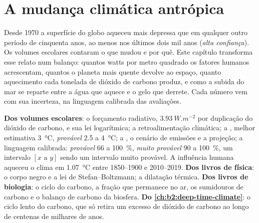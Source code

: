 \chapter{A mudança climática antrópica}\label{ch:b2:anthropogenic-climate-change}

Desde 1970 a superfície do globo aqueceu mais depressa que em qualquer outro período de cinquenta anos, ao menos nos
últimos dois mil anos (\emph{alta confiança}). Os volumes escolares contaram o que mudou e
por quê. Este capítulo transforma esse relato num balanço: quantos watts por metro quadrado os fatores
humanos acrescentam, quantos o planeta mais quente devolve ao espaço, quanto aquecimento cada tonelada de dióxido
de carbono produz, e como a subida do mar se reparte entre a água que aquece e o gelo que derrete. Cada número
vem com sua incerteza, na linguagem calibrada das avaliações.

\begin{recall}
\textbf{Dos volumes escolares}: o forçamento radiativo, $\qty{3.93}{W.m^{-2}}$ por duplicação do
dióxido de carbono, e sua lei logarítmica; a retroalimentação climática; a , melhor
estimativa \qty{3}{\celsius}, \emph{provável} 2.5 a \qty{4}{\celsius}; a , o cenário de emissões
e a projeção; a linguagem calibrada: \emph{provável} 66 a \qty{100}{\percent}, \emph{muito
provável} 90 a \qty{100}{\percent}, um intervalo $[x \text{ a } y]$ sendo um intervalo muito provável. A influência
humana aqueceu o clima em \qty{1.07}{\celsius} entre 1850--1900 e 2010--2019.
\textbf{Dos livros de física}: o corpo negro e a lei de Stefan--Boltzmann; a dilatação térmica.
\textbf{Dos livros de biologia}: o ciclo do carbono, a fração que permanece no ar, os sumidouros de carbono e o
balanço de carbono da biosfera. \textbf{Do \cref{ch:b2:deep-time-climate}}: o ciclo lento do carbono,
que só retira um excesso de dióxido de carbono ao longo de centenas de milhares de anos.
\end{recall}

